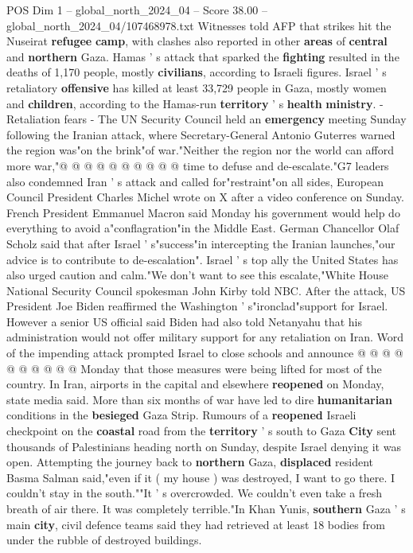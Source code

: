 \begin{textsample}{POS Dim 1 – global\_north\_2024\_04 – Score 38.00 – global\_north\_2024\_04/107468978.txt}
Witnesses told AFP that strikes hit the Nuseirat \textbf{refugee} \textbf{camp}, with clashes also reported in other \textbf{areas} of \textbf{central} and \textbf{northern} Gaza.
Hamas ' s attack that sparked the \textbf{fighting} resulted in the deaths of 1,170 people, mostly \textbf{civilians}, according to Israeli figures.
Israel ' s retaliatory \textbf{offensive} has killed at least 33,729 people in Gaza, mostly women and \textbf{children}, according to the Hamas-run \textbf{territory} ' s \textbf{health} \textbf{ministry}. - Retaliation fears - The UN Security Council held an \textbf{emergency} meeting Sunday following the Iranian attack, where Secretary-General Antonio Guterres warned the region was"on the brink"of war."Neither the region nor the world can afford more war,"@ @ @ @ @ @ @ @ @ @ time to defuse and de-escalate."G7 leaders also condemned Iran ' s attack and called for"restraint"on all sides, European Council President Charles Michel wrote on X after a video conference on Sunday.
French President Emmanuel Macron said Monday his government would help do everything to avoid a"conflagration"in the Middle East.
German Chancellor Olaf Scholz said that after Israel ' s"success"in intercepting the Iranian launches,"our advice is to contribute to de-escalation".
Israel ' s top ally the United States has also urged caution and calm."We don't want to see this escalate,"White House National Security Council spokesman John Kirby told NBC.
After the attack, US President Joe Biden reaffirmed the Washington ' s"ironclad"support for Israel.
However a senior US official said Biden had also told Netanyahu that his administration would not offer military support for any retaliation on Iran.
Word of the impending attack prompted Israel to close schools and announce @ @ @ @ @ @ @ @ @ @ Monday that those measures were being lifted for most of the country.
In Iran, airports in the capital and elsewhere \textbf{reopened} on Monday, state media said.
More than six months of war have led to dire \textbf{humanitarian} conditions in the \textbf{besieged} Gaza Strip.
Rumours of a \textbf{reopened} Israeli checkpoint on the \textbf{coastal} road from the \textbf{territory} ' s south to Gaza \textbf{City} sent thousands of Palestinians heading north on Sunday, despite Israel denying it was open.
Attempting the journey back to \textbf{northern} Gaza, \textbf{displaced} resident Basma Salman said,"even if it ( my house ) was destroyed, I want to go there.
I couldn't stay in the south.""It ' s overcrowded.
We couldn't even take a fresh breath of air there.
It was completely terrible."In Khan Yunis, \textbf{southern} Gaza ' s main \textbf{city}, civil defence teams said they had retrieved at least 18 bodies from under the rubble of destroyed buildings.

\end{textsample}

